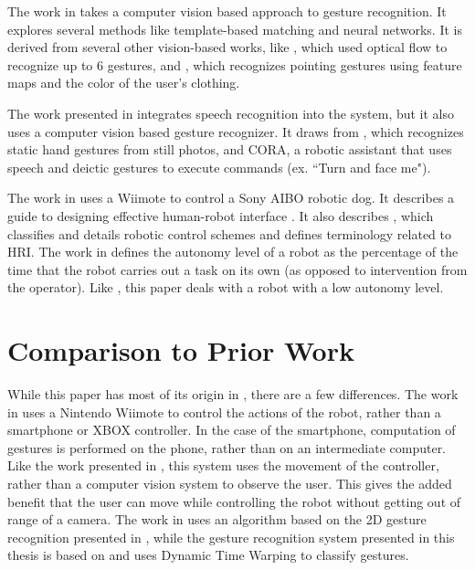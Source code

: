 \documentclass[12pt, letterpaper]{report}
\begin{document}
The work in \cite{Waldherr} takes a computer vision based approach to gesture recognition. It explores several methods like template-based matching and neural networks. It is derived from several other vision-based works, like \cite{Kortenkamp}, which used optical flow to recognize up to 6 gestures, and \cite{Kahn}, which recognizes pointing gestures using feature maps and the color of the user's clothing.

The work presented in \cite{Rogalla} integrates speech recognition into the system, but it also uses a computer vision based gesture recognizer. It draws from \cite{Kestler}, which recognizes static hand gestures from still photos, and CORA, a robotic assistant that uses speech and deictic gestures to execute commands (ex. ``Turn and face me").

The work in \cite{Guo} uses a Wiimote to control a Sony AIBO robotic dog. It describes a guide to designing effective human-robot interface \cite{GoodrichOlsen}. It also describes \cite{YancoDrury}, which classifies and details robotic control schemes and defines terminology related to HRI. The work in \cite{YancoDrury} defines the autonomy level of a robot as the percentage of the time that the robot carries out a task on its own (as opposed to intervention from the operator). Like \cite{Guo}, this paper deals with a robot with a low autonomy level.

\section*{Comparison to Prior Work}
While this paper has most of its origin in \cite{Varcholik_Barber_Nicholson_2008}, there are a few differences. The work in \cite{Varcholik_Barber_Nicholson_2008} uses a Nintendo Wiimote to control the actions of the robot, rather than a smartphone or XBOX controller. In the case of the smartphone, computation of gestures is performed on the phone, rather than on an intermediate computer. Like the work presented in \cite{Varcholik_Barber_Nicholson_2008}, this system uses the movement of the controller, rather than a computer vision system to observe the user. This gives the added benefit that the user can move while controlling the robot without getting out of range of a camera. The work in \cite{Varcholik_Barber_Nicholson_2008} uses an algorithm based on the 2D gesture recognition presented in \cite{Rubine}, while the gesture recognition system presented in this thesis is based on \cite{TaKG} and uses Dynamic Time Warping to classify gestures. 
\end{document}

